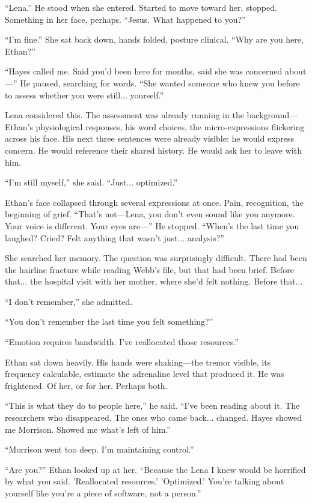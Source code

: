 ``Lena.'' He stood when she entered. Started to move toward her, stopped. Something in her face, perhaps. ``Jesus. What happened to you?''

``I'm fine.'' She sat back down, hands folded, posture clinical. ``Why are you here, Ethan?''

``Hayes called me. Said you'd been here for months, said she was concerned about—'' He paused, searching for words. ``She wanted someone who knew you before to assess whether you were still... yourself.''

Lena considered this. The assessment was already running in the background—Ethan's physiological responses, his word choices, the micro-expressions flickering across his face. His next three sentences were already visible: he would express concern. He would reference their shared history. He would ask her to leave with him.

``I'm still myself,'' she said. ``Just... optimized.''

Ethan's face collapsed through several expressions at once. Pain, recognition, the beginning of grief. ``That's not—Lena, you don't even sound like you anymore. Your voice is different. Your eyes are—'' He stopped. ``When's the last time you laughed? Cried? Felt anything that wasn't just... analysis?''

She searched her memory. The question was surprisingly difficult. There had been the hairline fracture while reading Webb's file, but that had been brief. Before that... the hospital visit with her mother, where she'd felt nothing. Before that...

``I don't remember,'' she admitted.

``You don't remember the last time you felt something?''

``Emotion requires bandwidth. I've reallocated those resources.''

Ethan sat down heavily. His hands were shaking—the tremor visible, its frequency calculable, estimate the adrenaline level that produced it. He was frightened. Of her, or for her. Perhaps both.

``This is what they do to people here,'' he said. ``I've been reading about it. The researchers who disappeared. The ones who came back... changed. Hayes showed me Morrison. Showed me what's left of him.''

``Morrison went too deep. I'm maintaining control.''

``Are you?'' Ethan looked up at her. ``Because the Lena I knew would be horrified by what you said. 'Reallocated resources.' 'Optimized.' You're talking about yourself like you're a piece of software, not a person.''

